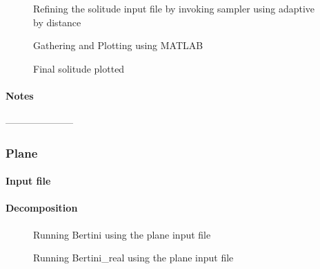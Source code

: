 	\begin{figure}[H]\centering
	    \caption{Refining the solitude input file by invoking sampler using adaptive by distance}
	\end{figure}

	\begin{figure}[H]\centering
	    \caption{Gathering and Plotting using MATLAB}
	\end{figure}

	\begin{figure}[H]\centering
	    \caption{Final solitude plotted}
	\end{figure}

\paragraph{Notes}


---------------------


\subsubsection{Plane}

\paragraph{Input file}


\paragraph{Decomposition}
	
	\begin{figure}[H]\centering
	    \caption{Running Bertini using the plane input file}
	\end{figure}

	\begin{figure}[H]\centering
	    \caption{Running Bertini\_real using the plane input file}
	\end{figure}
		
